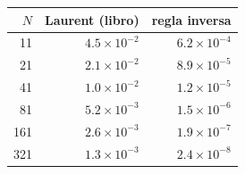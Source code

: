 \begin{tabular}{rrr}
\toprule
$N$ & Laurent (libro) & regla inversa \\
\midrule
11 & $4.5\times10^{-2}$ & $6.2\times10^{-4}$ \\
21 & $2.1\times10^{-2}$ & $8.9\times10^{-5}$ \\
41 & $1.0\times10^{-2}$ & $1.2\times10^{-5}$ \\
81 & $5.2\times10^{-3}$ & $1.5\times10^{-6}$ \\
161 & $2.6\times10^{-3}$ & $1.9\times10^{-7}$ \\
321 & $1.3\times10^{-3}$ & $2.4\times10^{-8}$ \\
\bottomrule
\end{tabular}
